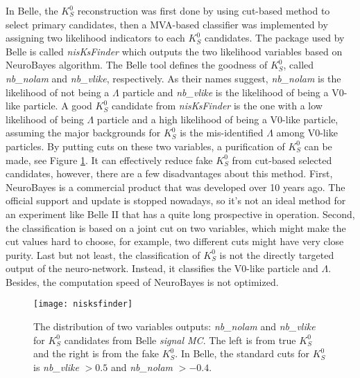  In Belle, the $K_S^0$ reconstruction was first done by using cut-based method to select primary candidates, then a MVA-based classifier was implemented by assigning two likelihood indicators to each $K_S^0$ candidates. The package used by Belle is called \textit{nisKsFinder}\cite{b2book} which outputs the two likelihood variables based on NeuroBayes algorithm\cite{feindt2006neurobayes}. The Belle tool defines the goodness of $K_S^0$, called \textit{nb\_nolam} and \textit{nb\_vlike}, respectively. As their names suggest, \textit{nb\_nolam} is the likelihood of not being a $\Lambda$ particle and \textit{nb\_vlike} is the likelihood of being a V0-like particle. A good $K_S^0$ candidate from \textit{nisKsFinder} is the one with a low likelihood of being $\Lambda$ particle and a high likelihood of being a V0-like particle, assuming the major backgrounds for $K_S^0$ is the mis-identified $\Lambda$ among V0-like particles. By putting cuts on these two variables, a purification of $K_S^0$ can be made, see Figure \ref{b1niskf}. It can effectively reduce fake $K_S^0$ from cut-based selected candidates, however, there are a few disadvantages about this method. First, NeuroBayes is a commercial product that was developed over 10 years ago. The official support and update is stopped nowadays, so it's not an ideal method for an experiment like Belle II that has a quite long prospective in operation. Second, the classification is based on a joint cut on two variables, which might make the cut values hard to choose, for example, two different cuts might have very close purity. Last but not least, the classification of $K_S^0$ is not the directly targeted output of the neuro-network. Instead, it classifies the V0-like particle and $\Lambda$. Besides, the computation speed of NeuroBayes is not optimized.

\begin{figure}[htpb]
	\centering 
	\texttt{[image: nisksfinder]}
	\caption{The distribution of two variables outputs: \textit{nb\_nolam} and \textit{nb\_vlike} for $K_S^0$ candidates from Belle \textit{signal MC}. The left is from true $K_S^0$ and the right is from the fake $K_S^0$. In Belle, the standard cuts for $K_S^0$ is \textit{nb\_vlike} $> 0.5$ and \textit{nb\_nolam} $> -0.4$\cite{kang2020measurement}.}
	\label{b1niskf}
\end{figure}



